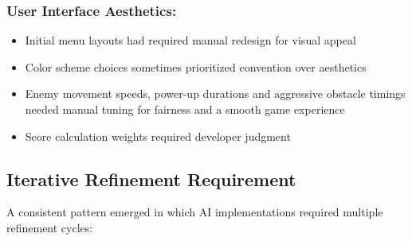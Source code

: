 \documentclass[12pt,a4paper]{article}
\begin{document}
\subsubsection*{User Interface Aesthetics:}
\begin{itemize}
    \item Initial menu layouts had required manual redesign for visual appeal
    \item Color scheme choices sometimes prioritized convention over aesthetics
    \item Enemy movement speeds, power-up durations and aggressive obstacle timings needed manual tuning for fairness and a smooth game experience
    \item Score calculation weights required developer judgment
\end{itemize}

\subsection{Iterative Refinement Requirement}

A consistent pattern emerged in which AI implementations required multiple refinement cycles:
\end{document}

